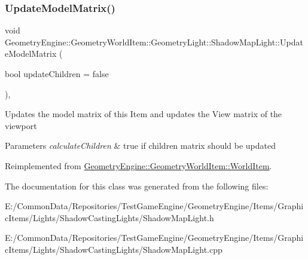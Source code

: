 \subsubsection{\texorpdfstring{UpdateModelMatrix()}{UpdateModelMatrix()}}
{\footnotesize\ttfamily void Geometry\+Engine\+::\+Geometry\+World\+Item\+::\+Geometry\+Light\+::\+Shadow\+Map\+Light\+::\+Update\+Model\+Matrix (\begin{DoxyParamCaption}\item[{bool}]{update\+Children = {\ttfamily false} }\end{DoxyParamCaption})\hspace{0.3cm}{\ttfamily [override]}, {\ttfamily [virtual]}}

Updates the model matrix of this Item and updates the View matrix of the viewport 
\begin{DoxyParams}{Parameters}
{\em calculate\+Children} & true if children matrix should be updated \\
\hline
\end{DoxyParams}


Reimplemented from \mbox{\hyperlink{class_geometry_engine_1_1_geometry_world_item_1_1_world_item_a86effd24c41c87be8925ee3addd8c33d}{Geometry\+Engine\+::\+Geometry\+World\+Item\+::\+World\+Item}}.



The documentation for this class was generated from the following files\+:\begin{DoxyCompactItemize}
\item 
E\+:/\+Common\+Data/\+Repositories/\+Test\+Game\+Engine/\+Geometry\+Engine/\+Items/\+Graphic\+Items/\+Lights/\+Shadow\+Casting\+Lights/Shadow\+Map\+Light.\+h\item 
E\+:/\+Common\+Data/\+Repositories/\+Test\+Game\+Engine/\+Geometry\+Engine/\+Items/\+Graphic\+Items/\+Lights/\+Shadow\+Casting\+Lights/Shadow\+Map\+Light.\+cpp\end{DoxyCompactItemize}
